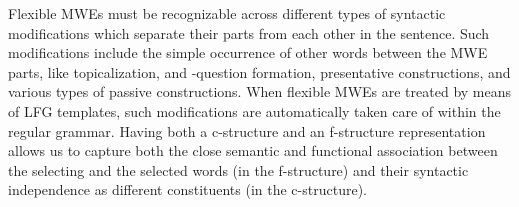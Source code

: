 \documentclass[output=paper]{langsci/langscibook}
\begin{document}
{{{{\ili{}%
\ili{}%
\ili{}%
\ili{}%
\ili{}%
\ili{}
\ili{}%
\ili{}
Flexible\ili{} MWEs\ili{} must\ili{} be\ili{} recognizable\ili{} across\ili{} different\ili{} types\ili{} of\ili{} syntactic\ili{} modifications\ili{} which\ili{} separate\ili{} their\ili{} parts\ili{} from\ili{} each\ili{} other\ili{} in\ili{} the\ili{} sentence\ili{}.\ili{}
Such\ili{} modifications\ili{} include\ili{} the\ili{} simple\ili{} occurrence\ili{} of\ili{} other\ili{} words\ili{} between\ili{} the\ili{} MWE\ili{} parts\ili{},\ili{} \ili{}\isi{}\ili{} like\ili{} topicalization\ili{},\ili{} \ili{}\isi{}\ili{} and\ili{} \ili{}\textit{}\ili{}-question\ili{} formation\ili{},\ili{} presentative\ili{} constructions\ili{},\ili{} and\ili{} various\ili{} types\ili{} of\ili{} passive\ili{} constructions\ili{}.\ili{}
When\ili{} flexible\ili{} MWEs\ili{} are\ili{} treated\ili{} by\ili{} means\ili{} of\ili{} LFG\ili{} templates\ili{},\ili{} such\ili{} modifications\ili{} are\ili{} automatically\ili{} taken\ili{} care\ili{} of\ili{} within\ili{} the\ili{} regular\ili{} grammar\ili{}.\ili{}
Having\ili{} both\ili{} a\ili{} c\ili{}-structure\ili{} and\ili{} an\ili{} f\ili{}-structure\ili{} representation\ili{} allows\ili{} us\ili{} to\ili{} capture\ili{} both\ili{} the\ili{} close\ili{} semantic\ili{} and\ili{} functional\ili{} association\ili{} between\ili{} the\ili{} selecting\ili{} and\ili{} the\ili{} selected\ili{} words\ili{} \ili{}(in\ili{} the\ili{} f\ili{}-structure\ili{})\ili{} and\ili{} their\ili{} syntactic\ili{} independence\ili{} as\ili{} different\ili{} constituents\ili{} \ili{}(in\ili{} the\ili{} c\ili{}-structure\ili{})\ili{}.\ili{}
}}}}
\end{document}
